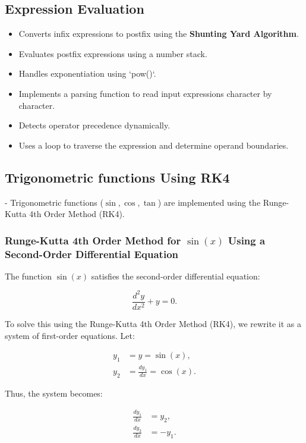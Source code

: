 \documentclass{article}
\begin{document}
\subsection{Expression Evaluation}
\begin{itemize}
	\item Converts infix expressions to postfix using the \textbf{Shunting Yard Algorithm}.
	\item Evaluates postfix expressions using a number stack.
	\item Handles exponentiation using `pow()`.
	\item Implements a parsing function to read input expressions character by character.
	\item Detects operator precedence dynamically.
	\item Uses a loop to traverse the expression and determine operand boundaries.
\end{itemize}

\subsection{Trigonometric functions Using RK4}
- Trigonometric functions ($\sin, \cos, \tan$) are implemented using the Runge-Kutta 4th Order Method (RK4).

\subsubsection{Runge-Kutta 4th Order Method for $\sin(x)$ Using a Second-Order Differential Equation}
The function $\sin(x)$ satisfies the second-order differential equation:

\begin{equation}
    \frac{d^2 y}{dx^2} + y = 0.
\end{equation}

To solve this using the Runge-Kutta 4th Order Method (RK4), we rewrite it as a system of first-order equations. Let:

\begin{align}
    y_1 &= y = \sin(x), \\
    y_2 &= \frac{dy_1}{dx} = \cos(x).
\end{align}

Thus, the system becomes:

\begin{align}
    \frac{dy_1}{dx} &= y_2, \\
    \frac{dy_2}{dx} &= -y_1.
\end{align}
\end{document}
